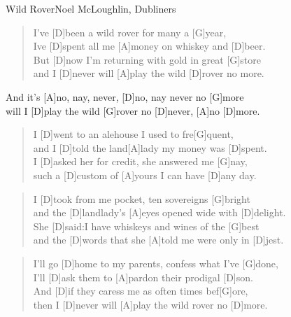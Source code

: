 \begin{song}{Wild Rover}{Noel McLoughlin, Dubliners}

    \begin{verse}  
        I've [D]been a wild rover for many a [G]year, \\ 
        Ive [D]spent all me [A]money on whiskey and [D]beer. \\
        But [D]now I'm returning with gold in great [G]store \\ 
        and I [D]never will [A]play the wild [D]rover no more.
    \end{verse}  

    \begin{chorus}
        And it's [A]no, nay, never, [D]no, nay never no [G]more \\
        will I [D]play the wild [G]rover no [D]never, [A]no [D]more.
    \end{chorus}

    \begin{verse}  
        I [D]went to an alehouse I used to fre[G]quent, \\
        and I [D]told the land[A]lady my money was [D]spent. \\
        I [D]asked her for credit, she answered me [G]nay, \\
        such a [D]custom of [A]yours I can have [D]any day. 
    \end{verse}  


    \begin{verse}  
        I [D]took from me pocket, ten sovereigns [G]bright \\
        and the [D]landlady's [A]eyes opened wide with [D]delight. \\
        She [D]said:I have whiskeys and wines of the [G]best \\
        and the [D]words that she [A]told me were only in [D]jest. 
    \end{verse}  


    \begin{verse}  
        I'll go [D]home to my parents, confess what I've [G]done, \\
        I'll [D]ask them to [A]pardon their prodigal [D]son. \\
        And [D]if they caress me as often times bef[G]ore, \\
        then I [D]never will [A]play the wild rover no [D]more.
    \end{verse}  


\end{song}
